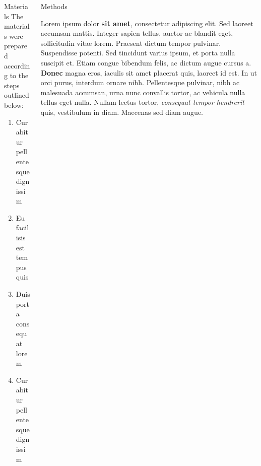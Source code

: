 \documentclass[]{beamer}
\begin{document}
\begin{frame}[t]
\begin{columns}[t]
\begin{column}{\twocolwid}
\begin{columns}[t,totalwidth=\twocolwid]
\begin{column}{\onecolwid}
\begin{block}{Materials}
    The materials were prepared according to the steps outlined below:
    
    \begin{enumerate}
    \item Curabitur pellentesque dignissim
    \item Eu facilisis est tempus quis
    \item Duis porta consequat lorem
    \item Curabitur pellentesque dignissim
    \end{enumerate}
    
    \end{block}
    
    
    \end{column} %
        
    \begin{column}{\onecolwid}\vspace{-.6in} %
    
    
    \begin{block}{Methods}
    
    Lorem ipsum dolor \textbf{sit amet}, consectetur adipiscing elit. Sed laoreet accumsan mattis. Integer sapien tellus, auctor ac blandit eget, sollicitudin vitae lorem. Praesent dictum tempor pulvinar. Suspendisse potenti. Sed tincidunt varius ipsum, et porta nulla suscipit et. Etiam congue bibendum felis, ac dictum augue cursus a. \textbf{Donec} magna eros, iaculis sit amet placerat quis, laoreet id est. In ut orci purus, interdum ornare nibh. Pellentesque pulvinar, nibh ac malesuada accumsan, urna nunc convallis tortor, ac vehicula nulla tellus eget nulla. Nullam lectus tortor, \textit{consequat tempor hendrerit} quis, vestibulum in diam. Maecenas sed diam augue.
    
    \end{block}
    
    
    \end{column} %
    

\end{columns}
\end{column}
\end{columns}
\end{frame}
\end{document}
